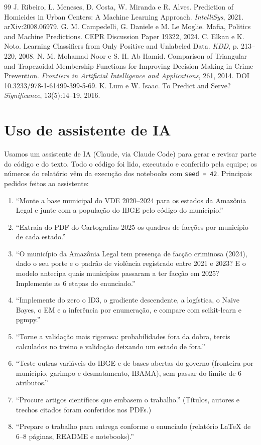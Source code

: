 \documentclass[10pt,a4paper,twocolumn]{article}
\begin{document}
\begin{thebibliography}{99}
 J. Ribeiro, L. Meneses, D. Costa, W. Miranda e R. Alves. Prediction of Homicides in Urban Centers: A Machine Learning Approach. \emph{IntelliSys}, 2021. arXiv:2008.06979.
 G. M. Campedelli, G. Daniele e M. Le Moglie. Mafia, Politics and Machine Predictions. CEPR Discussion Paper 19322, 2024.
 C. Elkan e K. Noto. Learning Classifiers from Only Positive and Unlabeled Data. \emph{KDD}, p. 213--220, 2008.
 N. M. Mohamad Noor e S. H. Ab Hamid. Comparison of Triangular and Trapezoidal Membership Functions for Improving Decision Making in Crime Prevention. \emph{Frontiers in Artificial Intelligence and Applications}, 261, 2014. DOI 10.3233/978-1-61499-399-5-69.
 K. Lum e W. Isaac. To Predict and Serve? \emph{Significance}, 13(5):14--19, 2016.
\end{thebibliography}

\appendix
\section{Uso de assistente de IA}
Usamos um assistente de IA (Claude, via Claude Code) para gerar e revisar parte do código e do
texto. Todo o código foi lido, executado e conferido pela equipe; os números do relatório vêm da
execução dos notebooks com \texttt{seed = 42}. Principais pedidos feitos ao assistente:
\begin{enumerate}\setlength\itemsep{0pt}\small
\item ``Monte a base municipal do VDE 2020--2024 para os estados da Amazônia Legal e junte com a população do IBGE pelo código do município.''
\item ``Extraia do PDF do Cartografias 2025 os quadros de facções por município de cada estado.''
\item ``O município da Amazônia Legal tem presença de facção criminosa (2024), dado o seu porte e o padrão de violência registrado entre 2021 e 2023? E o modelo antecipa quais municípios passaram a ter facção em 2025? Implemente as 6 etapas do enunciado.''
\item ``Implemente do zero o ID3, o gradiente descendente, a logística, o Naive Bayes, o EM e a inferência por enumeração, e compare com scikit-learn e pgmpy.''
\item ``Torne a validação mais rigorosa: probabilidades fora da dobra, tercis calculados no treino e validação deixando um estado de fora.''
\item ``Teste outras variáveis do IBGE e de bases abertas do governo (fronteira por município, garimpo e desmatamento, IBAMA), sem passar do limite de 6 atributos.''
\item ``Procure artigos científicos que embasem o trabalho.'' (Títulos, autores e trechos citados foram conferidos nos PDFs.)
\item ``Prepare o trabalho para entrega conforme o enunciado (relatório LaTeX de 6--8 páginas, README e notebooks).''
\end{enumerate}
\end{document}
